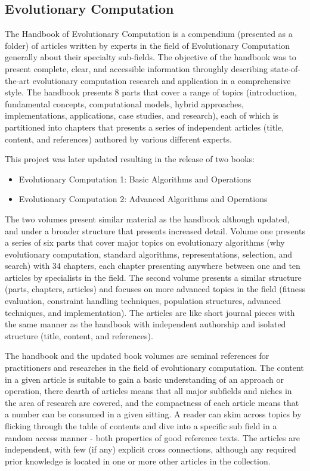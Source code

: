 \documentclass[a4paper, 11pt]{article}
\begin{document}
\subsection{Evolutionary Computation}
\label{subsec:ec}
The Handbook of Evolutionary Computation \cite{Baeck1997} is a compendium (presented as a folder) of articles written by experts in the field of Evolutionary Computation generally about their specialty sub-fields. The objective of the handbook was to present complete, clear, and accessible information throughly describing state-of-the-art evolutionary computation research and application in a comprehensive style. The handbook presents 8 parts that cover a range of topics (introduction, fundamental concepts, computational models, hybrid approaches, implementations, applications, case studies, and research), each of which is partitioned into chapters that presents a series of independent articles (title, content, and references) authored by various different experts.

This project was later updated resulting in the release of two books:

\begin{itemize}
	\item Evolutionary Computation 1: Basic Algorithms and Operations \cite{Baeck2000}
	\item Evolutionary Computation 2: Advanced Algorithms and Operations \cite{Baeck2000a}
\end{itemize} 

The two volumes present similar material as the handbook although updated, and under a broader structure that presents increased detail. Volume one presents a series of six parts that cover major topics on evolutionary algorithms (why evolutionary computation, standard algorithms, representations, selection, and search) with 34 chapters, each chapter presenting anywhere between one and ten articles by specialists in the field. The second volume presents a similar structure (parts, chapters, articles) and focuses on more advanced topics in the field (fitness evaluation, constraint handling techniques, population structures, advanced techniques, and implementation). The articles are like short journal pieces with the same manner as the handbook with independent authorship and isolated structure (title, content, and references).

The handbook and the updated book volumes are seminal references for practitioners and researches in the field of evolutionary computation. The content in a given article is suitable to gain a basic understanding of an approach or operation, there dearth of articles means that all major subfields and niches in the area of research are covered, and the compactness of each article means that a number can be consumed in a given sitting. 
A reader can skim across topics by flicking through the table of contents and dive into a specific sub field in a random access manner - both properties of good reference texts. The articles are independent, with few (if any) explicit cross connections, although any required prior knowledge is located in one or more other articles in the collection.
\end{document}
